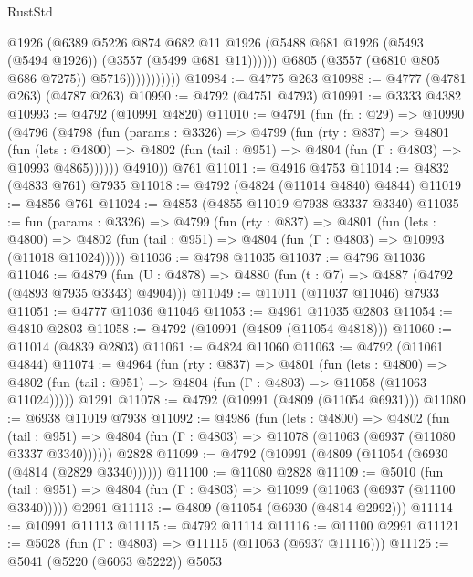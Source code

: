 \begin{lexlean}{RustStd}
\begin{coremodule}
                              @1926
                              (@6389
                                @5226
                                @874
                                @682
                                @11
                                @1926
                                (@5488 @681 @1926 (@5493 (@5494 @1926)) (@3557 (@5499 @681 @11))))))
                          @6805
                          (@3557 (@6810 @805 @686 @7275))
                          @5716)))))))))))
@10984 := @4775 @263
@10988 := @4777 (@4781 @263) (@4787 @263)
@10990 := @4792 (@4751 @4793)
@10991 := @3333 @4382
@10993 := @4792 (@10991 @4820)
@11010 := @4791
    (fun (fn : @29) =>
    @10990
      (@4796
        (@4798
          (fun (params : @3326) =>
          @4799
            (fun (rty : @837) =>
            @4801
              (fun (lets : @4800) =>
              @4802 (fun (tail : @951) => @4804 (fun (Γ : @4803) => @10993 @4865))))))
        @4910))
    @761
@11011 := @4916 @4753
@11014 := @4832 (@4833 @761) @7935
@11018 := @4792 (@4824 (@11014 @4840) @4844)
@11019 := @4856 @761
@11024 := @4853 (@4855 @11019 @7938 @3337 @3340)
@11035 := fun (params : @3326) =>
  @4799
    (fun (rty : @837) =>
    @4801
      (fun (lets : @4800) =>
      @4802 (fun (tail : @951) => @4804 (fun (Γ : @4803) => @10993 (@11018 @11024)))))
@11036 := @4798 @11035
@11037 := @4796 @11036
@11046 := @4879 (fun (U : @4878) => @4880 (fun (t : @7) => @4887 (@4792 (@4893 @7935 @3343) @4904)))
@11049 := @11011 (@11037 @11046) @7933
@11051 := @4777 @11036 @11046
@11053 := @4961 @11035 @2803
@11054 := @4810 @2803
@11058 := @4792 (@10991 (@4809 (@11054 @4818)))
@11060 := @11014 (@4839 @2803)
@11061 := @4824 @11060
@11063 := @4792 (@11061 @4844)
@11074 := @4964
    (fun (rty : @837) =>
    @4801
      (fun (lets : @4800) =>
      @4802 (fun (tail : @951) => @4804 (fun (Γ : @4803) => @11058 (@11063 @11024)))))
    @1291
@11078 := @4792 (@10991 (@4809 (@11054 @6931)))
@11080 := @6938 @11019 @7938
@11092 := @4986
    (fun (lets : @4800) =>
    @4802
      (fun (tail : @951) =>
      @4804 (fun (Γ : @4803) => @11078 (@11063 (@6937 (@11080 @3337 @3340))))))
    @2828
@11099 := @4792 (@10991 (@4809 (@11054 (@6930 (@4814 (@2829 @3340))))))
@11100 := @11080 @2828
@11109 := @5010
    (fun (tail : @951) => @4804 (fun (Γ : @4803) => @11099 (@11063 (@6937 (@11100 @3340)))))
    @2991
@11113 := @4809 (@11054 (@6930 (@4814 @2992)))
@11114 := @10991 @11113
@11115 := @4792 @11114
@11116 := @11100 @2991
@11121 := @5028 (fun (Γ : @4803) => @11115 (@11063 (@6937 @11116)))
@11125 := @5041 (@5220 (@6063 @5222)) @5053

\end{coremodule}
\end{lexlean}
